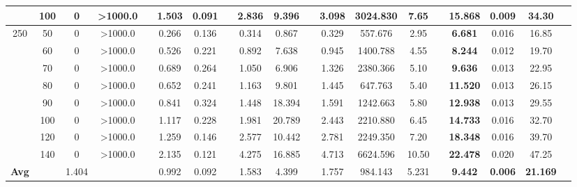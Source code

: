 \documentclass[algorithms,article,accept,moreauthors,pdftex]{Definitions/mdpi}
\begin{document}
\begin{specialtable}
\begin{footnotesize}
\begin{tabular}{ccccccccccccccccccc}
     & 100  & 0       & >1000.0 &&  1.503  &  0.091  & &  2.836  &  9.396   & &  3.098  &  3024.830 & 7.65  & & {\bf 15.868} & 0.009  & 34.30 \\ \midrule
 250 & 50   & 0       & >1000.0 &&  0.266  &  0.136  & &  0.314  &  0.867   & &  0.329  &  557.676  & 2.95  & & {\bf 6.681}  &  0.016 & 16.85 \\
     & 60   & 0       & >1000.0 &&  0.526  &  0.221  & &  0.892  &  7.638   & &  0.945  &  1400.788 & 4.55  & & {\bf 8.244}  &  0.012 & 19.70 \\
     & 70   & 0       & >1000.0 &&  0.689  &  0.264  & &  1.050  &  6.906   & &  1.326  &  2380.366 & 5.10  & & {\bf 9.636}  &  0.013 & 22.95 \\
     & 80   & 0       & >1000.0 &&  0.652  &  0.241  & &  1.163  &  9.801   & &  1.445  &  647.763  & 5.40  & & {\bf 11.520} & 0.013  & 26.15 \\
     & 90   & 0       & >1000.0 &&  0.841  &  0.324  & &  1.448  &  18.394  & &  1.591  &  1242.663 & 5.80  & & {\bf 12.938} & 0.013  & 29.55 \\
     & 100  & 0       & >1000.0 &&  1.117  &  0.228  & &  1.981  &  20.789  & &  2.443  &  2210.880 & 6.45  & & {\bf 14.733} & 0.016  & 32.70 \\
     & 120  & 0       & >1000.0 &&  1.259  &  0.146  & &  2.577  &  10.442  & &  2.781  &  2249.350 & 7.20  & & {\bf 18.348} & 0.016  & 39.70 \\
     & 140  & 0       & >1000.0 &&  2.135  &  0.121  & &  4.275  &  16.885  & &  4.713  &  6624.596 & 10.50 & & {\bf 22.478} & 0.020  & 47.25 \\ \midrule
\textbf{Avg} & & 1.404 & && 0.992 &	0.092	& &	 1.583	& 4.399   & &   1.757	 & 984.143	 & 5.231 & & \textbf{9.442}	 &\textbf{ 0.006} & \textbf{21.169} \\
\bottomrule
\end{tabular}
\end{footnotesize}
\end{specialtable}
\begin{paracol}{2}
\switchcolumn


\end{paracol}
\end{document}
